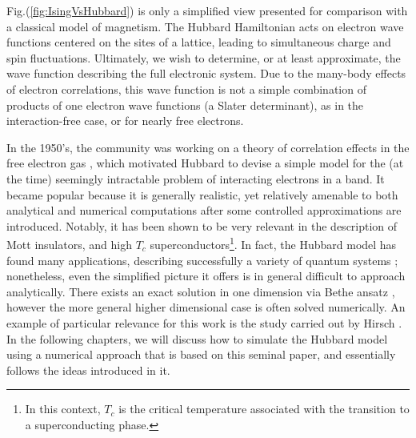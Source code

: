 Fig.(\ref{fig:IsingVsHubbard}) is only a simplified view presented for comparison with a classical model of magnetism.
The Hubbard Hamiltonian acts on electron wave functions centered on the sites of a lattice, leading to simultaneous charge and spin fluctuations. 
Ultimately, we wish to determine, or at least approximate, the wave function describing the full electronic system. 
Due to the many-body effects of electron correlations, this wave function is not a simple combination of products of one electron wave functions (a Slater determinant), as in the interaction-free case, or for nearly free electrons.

In the 1950's, the community was working on a theory of correlation effects in the free electron gas \cite{bohm_collective_1953, gell-mann_correlation_1957, sawada_correlation_1957, hubbard_description_1958, hubbard_description_1958_2, nozieres_electron_1958}, which motivated Hubbard to devise a simple model for the (at the time) seemingly intractable problem of interacting electrons in a band.
It became popular because it is generally realistic, yet relatively amenable to both analytical and numerical computations after some controlled approximations are introduced.
Notably, it has been shown to be very relevant in the description of Mott insulators, and high $T_c$  superconductors\footnote{In this context, $T_c$ is the critical temperature associated with the transition to a superconducting phase.}.
In fact, the Hubbard model has found many applications, describing successfully a variety of quantum systems \cite{editorial_hubbard_2013}; nonetheless, even the simplified picture it offers is in general difficult to approach analytically.
There exists an exact solution in one dimension via Bethe ansatz \cite{lieb_absence_1968}, however the more general higher dimensional case is often solved numerically.
An example of particular relevance for this work is the study carried out by Hirsch \cite{hirsch_two-dimensional_1985}.
In the following chapters, we will discuss how to simulate the Hubbard model using a numerical approach that is based on this seminal paper, and essentially follows the ideas introduced in it.